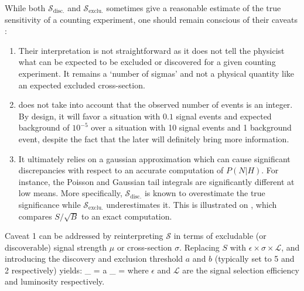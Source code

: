     While both $\mathcal{S}_\text{disc.}$ and $\mathcal{S}_\text{exclu.}$ sometimes give a reasonable estimate of the true
    sensitivity of a counting experiment, one should remain conscious of their caveats \cite{Punzi}:

    \begin{enumerate}
      \item Their interpretation is not straightforward as it does not tell the
            physicist what can be expected to be excluded or discovered
            for a given counting experiment. It remains a `number of sigmas' and not a
            physical quantity like an expected excluded cross-section.
      \item {} does not take into account that
            the observed number of events is an integer. By design, it will favor a situation
            with $0.1$ signal events and expected background of $10^{-5}$ over a
            situation with 10 signal events and 1 background event, despite the fact that
            the later will definitely bring more information.
      \item It ultimately relies on a gaussian approximation which can cause significant
            discrepancies with respect to an accurate computation of $P(N|H)$. For instance,
            the Poisson and Gaussian tail integrals are significantly different at low
            means. More specifically, $\mathcal{S}_\text{disc.}$ is known to overestimate
            the true significance while $\mathcal{S}_\text{exclu.}$ underestimates it.
            This is illustrated on , which
            compares $S/\sqrt{B}$ to an exact computation.
    \end{enumerate}

    Caveat 1 can be addressed by reinterpreting $\mathcal{S}$ in terms of excludable
    (or discoverable) signal strength $\mu$ or cross-section $\sigma$. Replacing
    $S$ with $\epsilon \times \sigma \times \mathcal{L}$, and introducing the discovery
    and exclusion threshold $a$ and $b$ (typically set to 5 and 2 respectively) yields:
    {
        \mathcal{\sigma}_ = a \cdot {}
       \hspace*{2cm}
       \mathcal{\sigma}_ =  \times {}
   }
    where $\epsilon$ and $\mathcal{L}$ are the signal selection efficiency and luminosity respectively.


